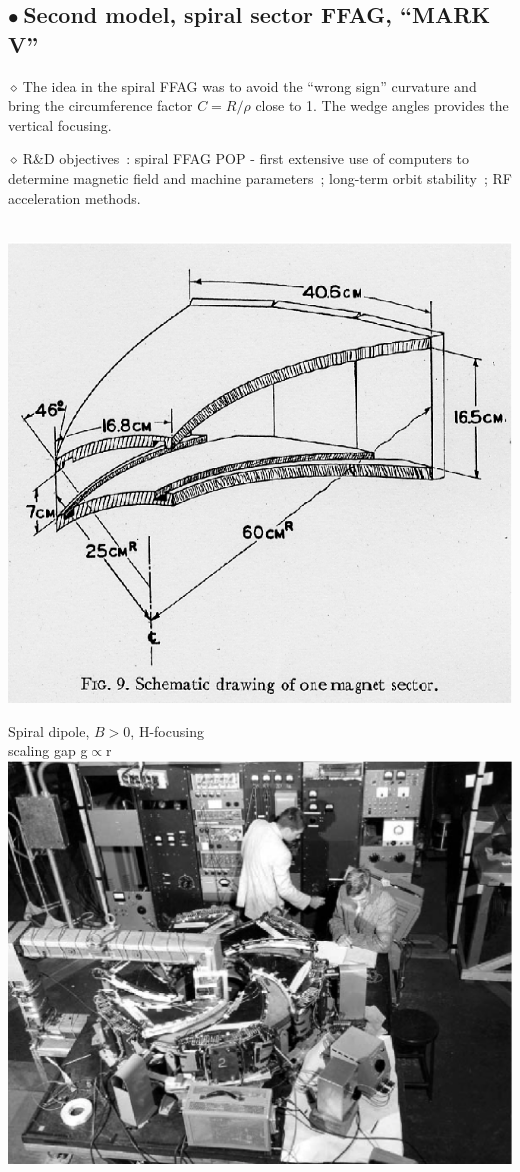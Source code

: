 \documentclass[12pt]{article}
\newcommand{\nib}{\noindent \ensuremath{\bullet~}}
\newcommand{\nid}{\noindent \ensuremath{\diamond~}}
\begin{document}

\hspace{-3ex}
\begin{minipage}[b]{1.\linewidth}
{\fontsize{16}{19} \selectfont


\subsection*{\LARGE \nib  Second model, spiral sector FFAG, ``MARK V''}

\nid The idea in the spiral FFAG was to 
avoid the ``wrong sign''  curvature and bring the circumference factor $C = R/\rho$ close to 1.
The  wedge angles provides the vertical focusing. 

\nid R\&D objectives~:  spiral FFAG POP - first extensive use of computers to determine 
magnetic field  and machine  parameters~; long-term orbit stability~; RF acceleration methods. \\
\\[-0ex]
\begin{minipage}[b]{.3\linewidth}
\centering

\includegraphics*[bbllx=14,bblly=44,bburx=250,bbury=230,width=6.cm,height=3.cm]{./figs_FFAG_introSlides/ringSpiralMagDraw.eps}

 Spiral dipole, $B>0$, H-focusing \\[-1ex]
scaling gap g$\propto$r\\[1ex]
 \includegraphics*[width=.99\linewidth]{./figs_FFAG_introSlides/markv.eps}


\end{minipage}}
\end{minipage}
\end{document}
